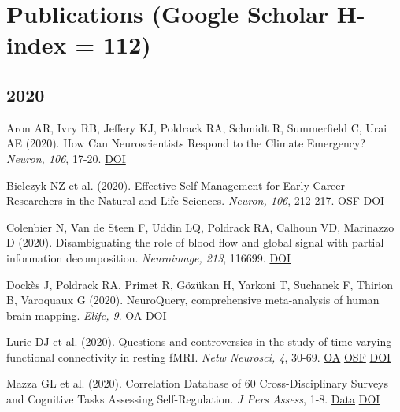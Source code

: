 \section*{Publications (Google Scholar H-index = 112)}

\subsection*{2020}

Aron AR, Ivry RB, Jeffery KJ, Poldrack RA, Schmidt R, Summerfield C, Urai AE (2020). How Can Neuroscientists Respond to the Climate Emergency? \textit{Neuron, 106}, 17-20. \href{http://dx.doi.org/10.1016/j.neuron.2020.02.019}{DOI} \vspace{2mm}

Bielczyk NZ et al. (2020). Effective Self-Management for Early Career Researchers in the Natural and Life Sciences. \textit{Neuron, 106}, 212-217. \href{https://osf.io/w6emk/}{OSF} \href{http://dx.doi.org/10.1016/j.neuron.2020.03.015}{DOI} \vspace{2mm}

Colenbier N, Van de Steen F, Uddin LQ, Poldrack RA, Calhoun VD, Marinazzo D (2020). Disambiguating the role of blood flow and global signal with partial information decomposition. \textit{Neuroimage, 213}, 116699. \href{http://dx.doi.org/10.1016/j.neuroimage.2020.116699}{DOI} \vspace{2mm}

Dockès J, Poldrack RA, Primet R, Gözükan H, Yarkoni T, Suchanek F, Thirion B, Varoquaux G (2020). NeuroQuery, comprehensive meta-analysis of human brain mapping. \textit{Elife, 9}. \href{https://www.ncbi.nlm.nih.gov/pmc/articles/PMC7164961}{OA} \href{http://dx.doi.org/10.7554/elife.53385}{DOI} \vspace{2mm}

Lurie DJ et al. (2020). Questions and controversies in the study of time-varying functional connectivity in resting fMRI. \textit{Netw Neurosci, 4}, 30-69. \href{https://www.ncbi.nlm.nih.gov/pmc/articles/PMC7006871}{OA} \href{https://osf.io/fa6zr/}{OSF} \href{http://dx.doi.org/10.1162/netn\_a\_00116}{DOI} \vspace{2mm}

Mazza GL et al. (2020). Correlation Database of 60 Cross-Disciplinary Surveys and Cognitive Tasks Assessing Self-Regulation. \textit{J Pers Assess}, 1-8. \href{https://github.com/IanEisenberg/Self\_Regulation\_Ontology/tree/master/Data}{Data} \href{http://dx.doi.org/10.1080/00223891.2020.1732994}{DOI} \vspace{2mm}

